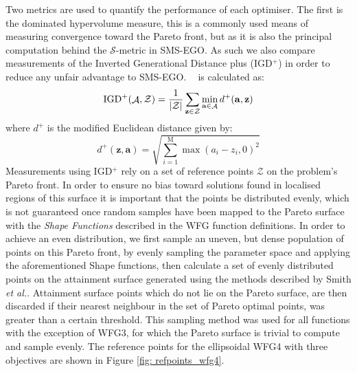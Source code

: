 \documentclass[conference]{IEEEtran}
\makeatletter
\DeclarePairedDelimiter\abs{\lvert}{\rvert}%
\DeclareMathOperator*{\attainmentfront}{\mathcal{A}}
\DeclareMathOperator*{\nobj}{M}
\DeclareMathOperator*{\igdp}{IGD^{+}}
\newcommand\smsego{SMS-EGO\xspace}
\newcommand\igd{IGD$^+$\xspace}
\newcommand{\pigdref}{\mathcal{Z}}
\newcommand*{\etal}{\textit{et al.}\@\xspace}
\makeatother
\begin{document}
Two metrics are used to quantify the performance of each optimiser. The first is the dominated hypervolume measure, this is a commonly used means of measuring convergence toward the Pareto front, but as it is also the principal computation behind the $\mathcal{S}$-metric in \smsego. As such we also compare measurements of the Inverted Generational Distance plus (\igd) \cite{ishibuchi2015modified} in order to reduce any unfair advantage to \smsego. $\igdp$ is calculated as:
\begin{equation}
    \igdp(\attainmentfront, \pigdref) = \frac{1}{\abs{\pigdref}}
    \sum_{\mathbf{z}\in\pigdref} \min_{\mathbf{a}\in \attainmentfront} d^{+}(\mathbf{a}, \mathbf{z})
\end{equation}
where $d^{+}$ is the modified Euclidean distance given by:
\begin{equation}
    d^+(\mathbf{z}, \mathbf{a}) = \sqrt{\sum^{\nobj}_{i=1}\max(a_i - z_i, 0)^2}
\end{equation}
Measurements using \igd rely on a set of reference points $\pigdref$ on the problem's Pareto front. In order to ensure no bias toward solutions found in localised regions of this surface it is important that the points be distributed evenly, which is not guaranteed once random samples have been mapped to the Pareto surface with the \textit{Shape Functions} described in the WFG function definitions. In order to achieve an even distribution, we first sample an uneven, but dense population of points on this Pareto front, by evenly sampling the parameter space and applying the aforementioned Shape functions, then calculate a set of evenly distributed points on the attainment surface generated using the methods described by Smith \etal \cite{smith2004dominance}. Attainment surface points which do not lie on the Pareto surface, are then discarded if their nearest neighbour in the set of Pareto optimal points, was greater than a certain threshold. This sampling method was used for all functions with the exception of WFG3, for which the Pareto surface is trivial to compute and sample evenly. The reference points for the ellipsoidal WFG4 with three objectives are shown in Figure \ref{fig: refpoints_wfg4}.  
\end{document}
